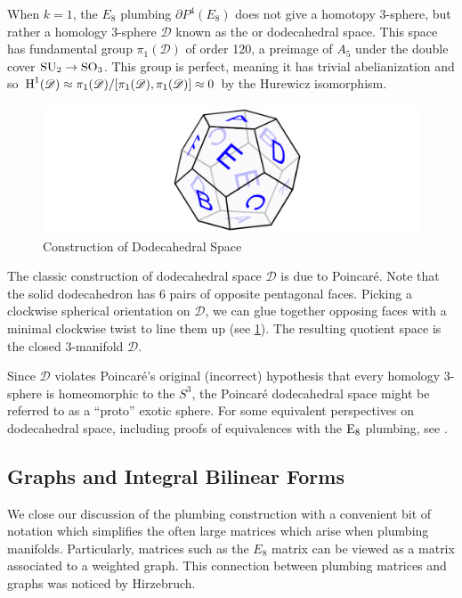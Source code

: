 \begin{remark*}
	When $k=1$, the $E_8$ plumbing $\partial P^{4}(E_8)$ does not give a homotopy $3$-sphere, but rather a homology $3$-sphere $\mathscr{D}$ known as the  or dodecahedral space. This space has fundamental group $\pi_1(\mathscr{D})$ of order 120, a preimage of $A_5$ under the double cover $\mathrm{SU}_2 \to \mathrm{SO}_3$. 
	This group is perfect, meaning it has trivial abelianization and so $\operatorname{H}^1(\mathscr{D})\approx \pi_1(\mathscr{D})/[\pi_1(\mathscr{D}), \pi_1(\mathscr{D})]\approx 0$ by the Hurewicz isomorphism.
		

\begin{figure}[ht]
	\centering
	\includegraphics[height=1.5in]{diagrams/dodecahedral-space-geometric-construction.png}
	\caption{Construction of Dodecahedral Space}\label{fig:dodecahedral_space_construction}
\end{figure}

	The classic construction of dodecahedral space $\mathscr{D}$ is due to Poincar\'e. Note that the solid dodecahedron has 6 pairs of opposite pentagonal faces. Picking a clockwise spherical orientation on $\mathscr{D}$, we can glue together opposing faces with a minimal clockwise twist to line them up (see \cref{fig:dodecahedral_space_construction}). The resulting quotient space is the closed $3$-manifold $\mathscr{D}$.

	Since $\mathscr{D}$ violates Poincar\'e's original (incorrect) hypothesis that every homology $3$-sphere is homeomorphic to the $S^3$, the Poincar\'e dodecahedral space might be referred to as a ``proto'' exotic sphere. For some equivalent perspectives on dodecahedral space, including proofs of equivalences with the $\mathrm{E}_8$ plumbing, see \cite{kirby1979eight}.
\end{remark*}

\subsection{Graphs and Integral Bilinear Forms}
We close our discussion of the plumbing construction with a convenient bit of notation which simplifies the often large matrices which arise when plumbing manifolds. Particularly, matrices such as the $E_8$ matrix can be viewed as a matrix associated to a weighted graph.
This connection between plumbing matrices and graphs was noticed by Hirzebruch.

